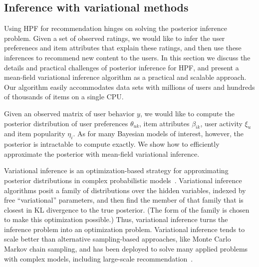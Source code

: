 \subsection{Inference with variational methods}
\label{sec:inference}

Using HPF for recommendation hinges on solving the posterior inference
problem.  Given a set of observed ratings, we would like to infer the
user preferenecs and item attributes that explain these ratings, and
then use these inferences to recommend new content to the users.  In
this section we discuss the details and practical challenges of
posterior inference for HPF, and present a mean-field variational
inference algorithm as a practical and scalable approach.  Our
algorithm easily accommodates data sets with millions of users and
hundreds of thousands of items on a single CPU.

Given an observed matrix of user behavior $y$, we would like to
compute the posterior distribution of user preferences $\theta_{uk}$,
item attributes $\beta_{ik}$, user activity $\xi_{u}$ and item
popularity $\eta_i$.  As for many Bayesian models of interest,
however, the posterior is intractable to compute exactly. We show how
to efficiently approximate the posterior with mean-field variational
inference.



Variational inference is an optimization-based strategy for
approximating posterior distributions in complex probabilistic
models~\cite{Jordan:1999,Wainwright:2008}.  Variational inference
algorithms posit a family of distributions over the hidden variables,
indexed by free ``variational'' parameters, and then find the member
of that family that is closest in KL divergence to the true posterior.
(The form of the family is chosen to make this optimization possible.)
Thus, variational inference turns the inference problem into an
optimization problem.  Variational inference tends to scale better
than alternative sampling-based approaches, like Monte Carlo Markov
chain sampling, and has been deployed to solve many applied problems
with complex models, including large-scale
recommendation~\cite{Paquet:2013p9197}.

